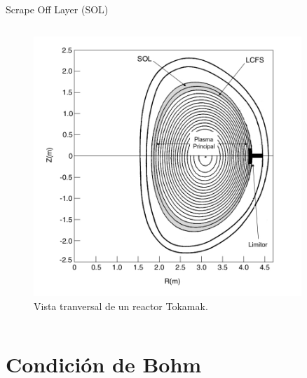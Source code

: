 \documentclass[11pt]{beamer}
\begin{document}
\begin{frame}{Scrape Off Layer (SOL)}
\begin{columns}
        \begin{column}{0.4\textwidth}
        \begin{figure}
        \centering
         \includegraphics[width=0.9\textwidth]{SOL_LCFS.jpg}
        \caption{Vista tranversal de un reactor Tokamak.}
        \label{fig:sol}
        \end{figure}
        \end{column}
        
        \end{columns}
            
        \end{frame}
        
    \section{Condición de Bohm}
    
\end{document}
